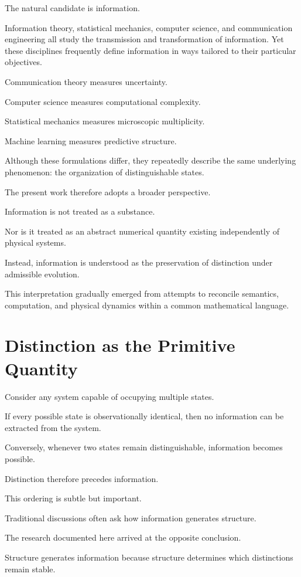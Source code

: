 \documentclass[11pt,oneside]{book}
\numberwithin{equation}{chapter}
\theoremstyle{definition}
\theoremstyle{plain}
\begin{document}
The natural candidate is information.

Information theory, statistical mechanics, computer science, and
communication engineering all study the transmission and transformation of
information. Yet these disciplines frequently define information in ways
tailored to their particular objectives.

Communication theory measures uncertainty.

Computer science measures computational complexity.

Statistical mechanics measures microscopic multiplicity.

Machine learning measures predictive structure.

Although these formulations differ, they repeatedly describe the same
underlying phenomenon: the organization of distinguishable states.

The present work therefore adopts a broader perspective.

Information is not treated as a substance.

Nor is it treated as an abstract numerical quantity existing independently
of physical systems.

Instead, information is understood as the preservation of distinction under
admissible evolution.

This interpretation gradually emerged from attempts to reconcile semantics,
computation, and physical dynamics within a common mathematical language.

\section{Distinction as the Primitive Quantity}

Consider any system capable of occupying multiple states.

If every possible state is observationally identical, then no information
can be extracted from the system.

Conversely, whenever two states remain distinguishable, information becomes
possible.

Distinction therefore precedes information.

This ordering is subtle but important.

Traditional discussions often ask how information generates structure.

The research documented here arrived at the opposite conclusion.

Structure generates information because structure determines which
distinctions remain stable.
\end{document}
